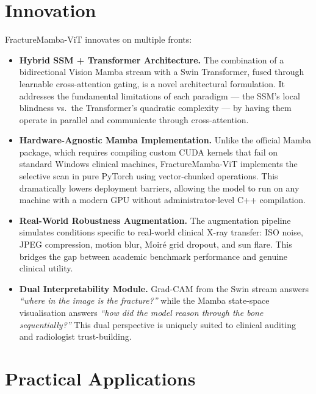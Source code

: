 \documentclass[12pt, a4paper]{article}
\begin{document}
\section{Innovation}

FractureMamba-ViT innovates on multiple fronts:

\begin{itemize}

  \item \textbf{Hybrid SSM + Transformer Architecture.}
  The combination of a bidirectional Vision Mamba stream with a Swin Transformer, fused through
  learnable cross-attention gating, is a novel architectural formulation. It addresses the
  fundamental limitations of each paradigm — the SSM's local blindness vs.\ the Transformer's
  quadratic complexity — by having them operate in parallel and communicate through
  cross-attention.

  \item \textbf{Hardware-Agnostic Mamba Implementation.}
  Unlike the official Mamba package, which requires compiling custom CUDA kernels that fail on
  standard Windows clinical machines, FractureMamba-ViT implements the selective scan in pure
  PyTorch using vector-chunked operations. This dramatically lowers deployment barriers, allowing
  the model to run on any machine with a modern GPU without administrator-level C++ compilation.

  \item \textbf{Real-World Robustness Augmentation.}
  The augmentation pipeline simulates conditions specific to real-world clinical X-ray transfer:
  ISO noise, JPEG compression, motion blur, Moir\'{e} grid dropout, and sun flare. This bridges
  the gap between academic benchmark performance and genuine clinical utility.

  \item \textbf{Dual Interpretability Module.}
  Grad-CAM from the Swin stream answers \emph{``where in the image is the fracture?''} while
  the Mamba state-space visualisation answers \emph{``how did the model reason through the
  bone sequentially?''} This dual perspective is uniquely suited to clinical auditing and
  radiologist trust-building.

\end{itemize}

\section{Practical Applications}
\end{document}

